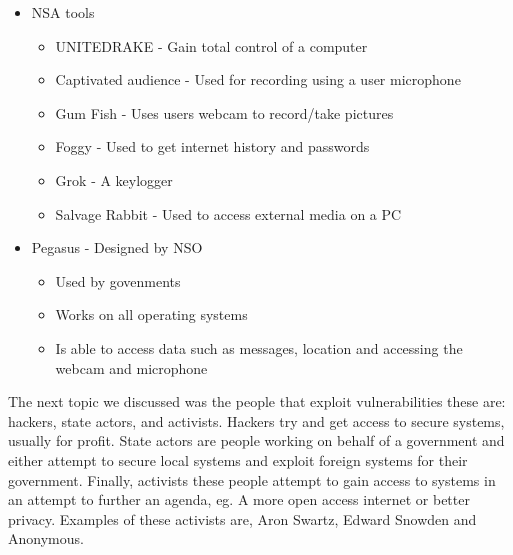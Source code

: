 \documentclass{article}
\begin{document}
\begin{itemize}

    \item{NSA tools}

        \begin{itemize}
            
            \item{UNITEDRAKE - Gain total control of a computer}

            \item{Captivated audience - Used for recording using a user microphone}

            \item{Gum Fish - Uses users webcam to record/take pictures}

            \item{Foggy - Used to get internet history and passwords}

            \item{Grok - A keylogger}

            \item{Salvage Rabbit - Used to access external media on a PC}

        \end{itemize}
    
    \item{Pegasus - Designed by NSO}

        \begin{itemize}
            
            \item{Used by govenments}

            \item{Works on all operating systems}

            \item{Is able to access data such as messages, location and accessing the webcam and
                microphone}

        \end{itemize}

\end{itemize}

The next topic we discussed was the people that exploit vulnerabilities these are: hackers, state
actors, and activists. Hackers try and get access to secure systems, usually for profit. State
actors are people working on behalf of a government and either attempt to secure local systems
and exploit foreign systems for their government. Finally, activists these people attempt to gain
access to systems in an attempt to further an agenda, eg. A more open access internet or better
privacy. Examples of these activists are, Aron Swartz, Edward Snowden and Anonymous.\\
\end{document}
